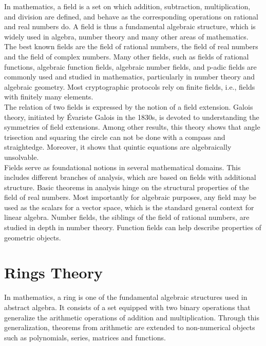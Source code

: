 In mathematics, a field is a set on which addition, subtraction, multiplication, and division are defined, and behave as the corresponding operations on rational and real numbers do. A field is thus a fundamental algebraic structure, which is widely used in algebra, number theory and many other areas of mathematics.\\
The best known fields are the field of rational numbers, the field of real numbers and the field of complex numbers. Many other fields, such as fields of rational functions, algebraic function fields, algebraic number fields, and p-adic fields are commonly used and studied in mathematics, particularly in number theory and algebraic geometry. Most cryptographic protocols rely on finite fields, i.e., fields with finitely many elements.\\
The relation of two fields is expressed by the notion of a field extension. Galois theory, initiated by Évariste Galois in the 1830s, is devoted to understanding the symmetries of field extensions. Among other results, this theory shows that angle trisection and squaring the circle can not be done with a compass and straightedge. Moreover, it shows that quintic equations are algebraically unsolvable.\\
Fields serve as foundational notions in several mathematical domains. This includes different branches of analysis, which are based on fields with additional structure. Basic theorems in analysis hinge on the structural properties of the field of real numbers. Most importantly for algebraic purposes, any field may be used as the scalars for a vector space, which is the standard general context for linear algebra. Number fields, the siblings of the field of rational numbers, are studied in depth in number theory. Function fields can help describe properties of geometric objects.\\

\section{Rings Theory}

In mathematics, a ring is one of the fundamental algebraic structures used in abstract algebra. It consists of a set equipped with two binary operations that generalize the arithmetic operations of addition and multiplication. Through this generalization, theorems from arithmetic are extended to non-numerical objects such as polynomials, series, matrices and functions.\\

